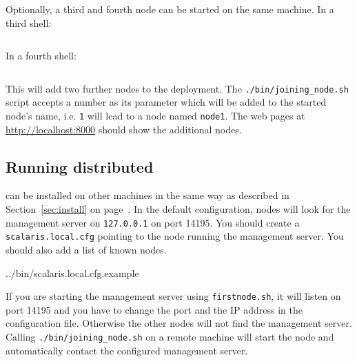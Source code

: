 \documentclass[a4paper]{scrreprt}
\newcommand{\codesnippet}[4][language=erlang]{
{%
\lstset{numbers=left}

{#4}
}
}
\newcommand{\sieheref}[1]{\ref{#1} on page~\pageref{#1}}
\newcommand{\code}[1]{\lstinline[basicstyle=\ttfamily]!#1!}
\newcommand{\filetitle}[1]{\hbox to \linewidth{~~File \code{#1:}\hfill}}
\begin{document}
Optionally, a third and fourth node can be started on the same
machine. In a third shell:
\begin{lstlisting}[language=sh]
%> ./bin/joining_node.sh 2
\end{lstlisting}

In a fourth shell:
\begin{lstlisting}[language=sh]
%> ./bin/joining_node.sh 3
\end{lstlisting}

This will add two further nodes to the deployment. The
\code{./bin/joining_node.sh} script accepts a number as its parameter which
will be added to the started node's name, i.e. \code{1} will lead to a node
named \code{node1}.
The web pages at \url{http://localhost:8000} should show the additional nodes.

\subsection{Running distributed}

\scalaris{} can be installed on other machines in the same way as
described in Section~\sieheref{sec:install}. In the default configuration,
nodes will look for the management server on \code{127.0.0.1} on port 14195. You
should create a \code{scalaris.local.cfg} pointing to the node running
the management server. You should also add a list of known nodes.

\codesnippet{scalaris.local.cfg}{local_cfg:distributed}{../bin/scalaris.local.cfg.example}

If you are starting the management server using \code{firstnode.sh}, it will
listen on port 14195 and you have to change the port and the IP address in the
configuration file. Otherwise the other nodes will not find the management
server. Calling \code{./bin/joining_node.sh} on a remote machine will start the
node and automatically contact the configured management server.



\end{document}

